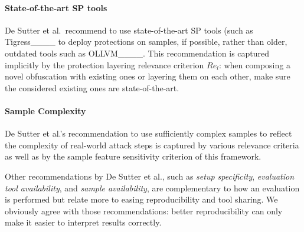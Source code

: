 \paragraph{State-of-the-art SP tools} De Sutter et al.\ recommend to use state-of-the-art SP tools (such as Tigress____ to deploy protections on samples, if possible, rather than older, outdated tools such as OLLVM____. This recommendation is captured implicitly by the protection layering relevance criterion $Re_l$: when composing a novel obfuscation with existing ones or layering them on each other, make sure the considered existing ones are state-of-the-art. 
\paragraph{Sample Complexity} De Sutter et al.'s recommendation to use sufficiently complex samples to reflect the complexity of real-world attack steps is captured by various relevance criteria as well as by the sample feature sensitivity criterion of this framework.   

\vspace{0.2cm}

Other recommendations by De Sutter et al., such as \emph{setup specificity}, \emph{evaluation tool availability}, and \emph{sample availability}, are complementary to how an evaluation is performed but relate more to easing reproducibility and tool sharing. We obviously agree with those recommendations: better reproducibility can only make it easier to interpret results correctly.